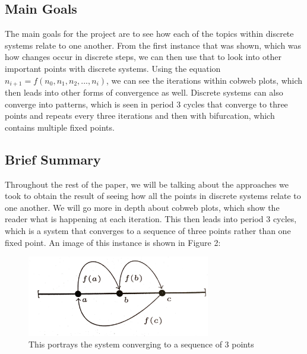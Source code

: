 \documentclass{article}
\begin{document}
\subsection{Main Goals}
The main goals for the project are to see how each of the topics within discrete systems relate to one another. From the first instance that was shown, which was how changes occur in discrete steps, we can then use that to look into other important points with discrete systems. Using the equation $n_{i+1}=f(n_0,n_1,n_2,...,n_i)$, we can see the iterations within cobweb plots, which then leads into other forms of convergence as well. Discrete systems can also converge into patterns, which is seen in period 3 cycles that converge to three points and repeats every three iterations and then with bifurcation, which contains multiple fixed points.

\subsection{Brief Summary}
Throughout the rest of the paper, we will be talking about the approaches we took to obtain the result of seeing how all the points in discrete systems relate to one another. We will go more in depth about cobweb plots, which show the reader what is happening at each iteration. This then leads into period 3 cycles, which is a system that converges to a sequence of three points rather than one fixed point. An image of this instance is shown in Figure 2:
\begin{figure}[htp]
    \centering
    \includegraphics[width=8cm]{period3cycle.png}
    \caption{This portrays the system converging to a sequence of 3 points}
    \label{fig:Period 3 Cycle}
\end{figure}
\end{document}
